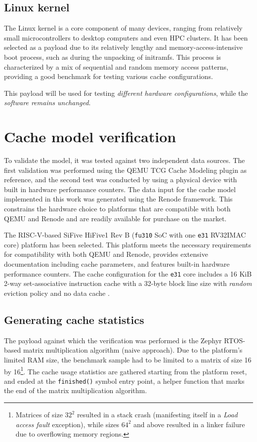 \subsection{Linux kernel}
The Linux kernel is a core component of many devices, ranging from relatively small microcontrollers to desktop computers and even HPC clusters.
It has been selected as a payload due to its relatively lengthy and memory-access-intensive boot process, such as during the unpacking of initramfs. This process is
characterized by a mix of sequential and random memory access patterns, providing a good benchmark for testing various cache configurations.

\noindent This payload will be used for testing \textit{different hardware configurations}, while the \textit{software remains unchanged}.

\section{Cache model verification}

To validate the model, it was tested against two independent data sources. The first validation was performed using the QEMU TCG Cache Modeling plugin as reference, and the
second test was conducted by using a physical device with built in hardware performance counters. The data input for the cache model implemented in this work was generated using
the Renode framework. This constrains the hardware choice to platforms that are compatible with both QEMU and Renode and are readily available for purchase on the market.

The RISC-V-based SiFive HiFive1 Rev B (\texttt{fu310} SoC with one \texttt{e31} RV32IMAC core) platform has been selected. This platform meets the necessary requirements for
compatibility with both QEMU and Renode, provides extensive documentation including cache parameters, and features built-in hardware performance counters.
The cache configuration for the \texttt{e31} core includes a 16 KiB 2-way set-associative instruction cache with a 32-byte block line size with \textit{random} eviction policy and
no data cache \cite{fe310docs}.

\subsection{Generating cache statistics} \label{sec:gencachestats}

The payload against which the verification was performed is the Zephyr RTOS-based matrix multiplication algorithm (naive approach). Due to the
platform's limited RAM size, the benchmark sample had to be limited to a matrix of size 16 by 16\footnote{Matrices of size $32^2$ resulted in a stack crash (manifesting itself in
a \textit{Load access fault} exception), while sizes $64^2$ and above resulted in a linker failure due to overflowing memory regions.}. The cache usage statistics are gathered
starting from the platform reset, and ended at the \texttt{finished()} symbol entry point, a helper function that marks the end of the matrix multiplication algorithm.\label{snip:measurement_window}

